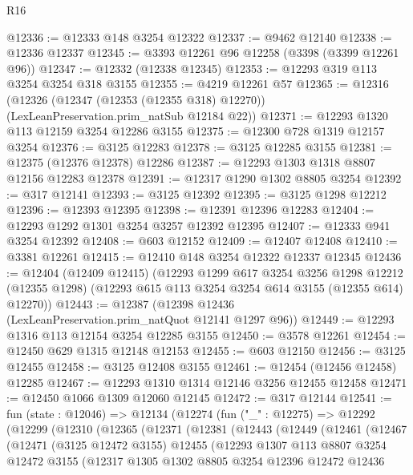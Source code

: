 \begin{lexlean}{R16}
\begin{coremodule}
@12336 := @12333 @148 @3254 @12322
@12337 := @9462 @12140
@12338 := @12336 @12337
@12345 := @3393 @12261 @96 @12258 (@3398 (@3399 @12261 @96))
@12347 := @12332 (@12338 @12345)
@12353 := @12293 @319 @113 @3254 @3254 @318 @3155
@12355 := @4219 @12261 @57
@12365 := @12316
    (@12326 (@12347 (@12353 (@12355 @318) @12270)) (LexLeanPreservation.prim_natSub @12184 @22))
@12371 := @12293 @1320 @113 @12159 @3254 @12286 @3155
@12375 := @12300 @728 @1319 @12157 @3254
@12376 := @3125 @12283
@12378 := @3125 @12285 @3155
@12381 := @12375 (@12376 @12378) @12286
@12387 := @12293 @1303 @1318 @8807 @12156 @12283 @12378
@12391 := @12317 @1290 @1302 @8805 @3254
@12392 := @317 @12141
@12393 := @3125 @12392
@12395 := @3125 @1298 @12212
@12396 := @12393 @12395
@12398 := @12391 @12396 @12283
@12404 := @12293 @1292 @1301 @3254 @3257 @12392 @12395
@12407 := @12333 @941 @3254 @12392
@12408 := @603 @12152
@12409 := @12407 @12408
@12410 := @3381 @12261
@12415 := @12410 @148 @3254 @12322 @12337 @12345
@12436 := @12404
    (@12409 @12415)
    (@12293
      @1299
      @617
      @3254
      @3256
      @1298
      @12212
      (@12355 @1298)
      (@12293 @615 @113 @3254 @3254 @614 @3155 (@12355 @614) @12270))
@12443 := @12387 (@12398 @12436 (LexLeanPreservation.prim_natQuot @12141 @1297 @96))
@12449 := @12293 @1316 @113 @12154 @3254 @12285 @3155
@12450 := @3578 @12261
@12454 := @12450 @629 @1315 @12148 @12153
@12455 := @603 @12150
@12456 := @3125 @12455
@12458 := @3125 @12408 @3155
@12461 := @12454 (@12456 @12458) @12285
@12467 := @12293 @1310 @1314 @12146 @3256 @12455 @12458
@12471 := @12450 @1066 @1309 @12060 @12145
@12472 := @317 @12144
@12541 := fun (state : @12046) =>
  @12134
    (@12274
      (fun ("_" : @12275) =>
      @12292
        (@12299
          (@12310
            (@12365
              (@12371
                (@12381
                  (@12443
                    (@12449
                      (@12461
                        (@12467
                          (@12471
                            (@3125 @12472 @3155)
                            @12455
                            (@12293
                              @1307
                              @113
                              @8807
                              @3254
                              @12472
                              @3155
                              (@12317
                                @1305
                                @1302
                                @8805
                                @3254
                                @12396
                                @12472
                                @12436

\end{coremodule}
\end{lexlean}
